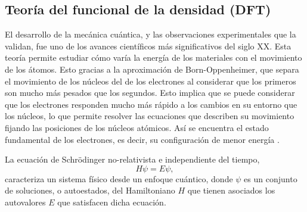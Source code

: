 \subsection{Teoría del funcional de la densidad (DFT)}

El desarrollo de la mecánica cuántica, y las observaciones experimentales que la
validan, fue uno de los avances científicos más significativos del siglo XX. 
Esta teoría permite estudiar cómo varía la energía de los materiales con el 
movimiento de los átomos. Esto gracias a la aproximación de Born-Oppenheimer, que 
separa el movimiento de los núcleos del de los electrones al considerar que los primeros son mucho más
pesados que los segundos. Esto implica que se puede considerar que los electrones 
responden mucho más rápido a los cambios en su entorno que los núcleos, lo que 
permite resolver las ecuaciones que describen su movimiento fijando las 
posiciones de los núcleos atómicos. Así se encuentra el estado fundamental de los
electrones, es decir, su configuración de menor energía \cite{shankar2012}.

La ecuación de Schrödinger no-relativista e independiente del tiempo,
\begin{equation}\label{eq:schrodinger}
    H \psi = E \psi,
\end{equation}
caracteriza un sistema físico desde un enfoque cuántico, donde $\psi$ es un
conjunto de soluciones, o autoestados, del Hamiltoniano $H$ que tienen asociados los
autovalores $E$ que satisfacen dicha ecuación. 

